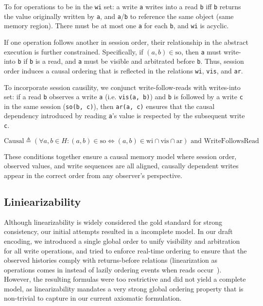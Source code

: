 To for operations to be in the \texttt{wi} set: a write \texttt{a}
writes into a read \texttt{b} iff \texttt{b} returns
the value originally written by \texttt{a}, and \texttt{a}/\texttt{b}
to reference the same object
(same memory region). There must be at most one \texttt{a} for each
\texttt{b}, and \texttt{wi} is
acyclic.

If one operation follows another in session order, their relationship in the
abstract execution is further constrained. Specifically, if $(a, b)
\in \text{so}$,
then \texttt{a} must write-into \texttt{b} if \texttt{b} is a read,
and \texttt{a} must be visible and
arbitrated before \texttt{b}. Thus, session order induces a causal
ordering that is
reflected in the relations \texttt{wi}, \texttt{vis}, and \texttt{ar}.

To incorporate session causility, we conjunct write-follow-reads with
writes-into set: if a read \texttt{b} observes a write \texttt{a}
(i.e. \texttt{vis(a, b)}) and \texttt{b} is
followed by a write \texttt{c} in the same session (\texttt{so(b,
c)}), then \texttt{ar(a, c)} ensures
that the causal dependency introduced by reading \texttt{a}'s value
is respected by the
subsequent write \texttt{c}.

$$
\text{Causal} \triangleq (\forall a, b \in H: (a, b) \in \text{so}
\Leftrightarrow (a, b) \in \text{wi} \cap \text{vis} \cap \text{ar})
\text{ and } \text{WriteFollowsRead}
$$

These conditions together ensure a causal memory model where session order,
observed values, and write sequences are all aligned, causally dependent writes
appear in the correct order from any observer's perspective.

\subsection{Liniearizability}

Although linearizability is widely considered the gold standard for strong
consistency, our initial attempts resulted in a incomplete model. In our draft
encoding, we introduced a single global order to unify visibility and
arbitration for all write operations, and tried to enforce real-time ordering to
ensure that the observed histories comply with returns-before relations
(linearization as operations comes in instead of lazily ordering events when
reads occur~\cite{zhang2018building}). However, the resulting formulas were too
restrictive and did not yield a complete model, as linearizability mandates a
very strong global ordering property that is non-trivial to capture in our
current axiomatic formulation.
